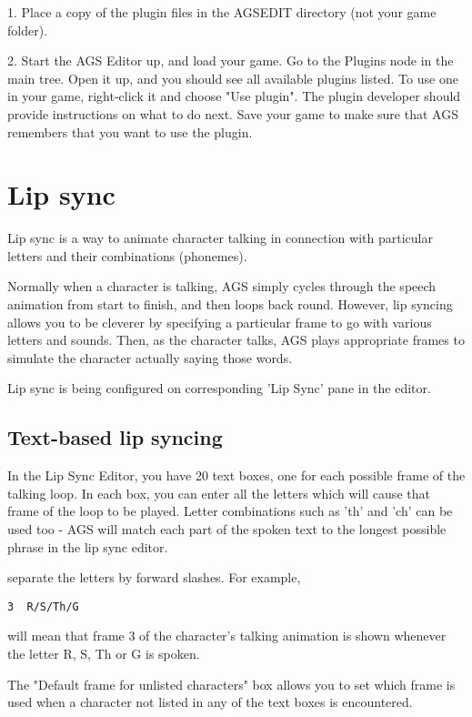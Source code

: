 1. Place a copy of the plugin files in the AGSEDIT directory (not your game folder).

2. Start the AGS Editor up, and load your game. Go to the Plugins node in the main tree.
Open it up, and you should see all available plugins listed. To use one in your game,
right-click it and choose "Use plugin". The plugin developer should provide
instructions on what to do next. Save your game to make sure that AGS remembers
that you want to use the plugin.

\section{Lip sync}%

Lip sync is a way to animate character talking in connection with particular letters and their combinations (phonemes).

Normally when a character is talking, AGS simply cycles through the speech animation
from start to finish, and then loops back round. However, lip syncing allows you to be
cleverer by specifying a particular frame to go with various letters and sounds. Then,
as the character talks, AGS plays appropriate frames to simulate the character actually
saying those words.

Lip sync is being configured on corresponding 'Lip Sync' pane in the editor.

\subsection{Text-based lip syncing}%

In the Lip Sync Editor, you have 20 text boxes, one for each possible frame of the
talking loop. In each box, you can enter all the letters which will cause that frame of
the loop to be played. Letter combinations such as 'th' and 'ch' can be used too - AGS
will match each part of the spoken text to the longest possible phrase in the lip sync
editor.

separate the letters by forward slashes. For example,

\begin{verbatim}
3  R/S/Th/G
\end{verbatim}

will mean that frame 3 of the character's talking animation is shown whenever the
letter R, S, Th or G is spoken.

The "Default frame for unlisted characters" box allows you to set which frame is used
when a character not listed in any of the text boxes is encountered.

